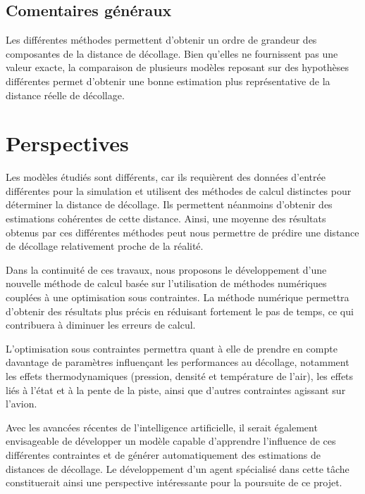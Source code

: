 	\vspace*{1cm}
	
	\subsection{Comentaires généraux  }
	
	Les différentes méthodes permettent d'obtenir un ordre de grandeur des composantes de la distance de décollage.
	Bien qu'elles ne fournissent pas une valeur exacte, la comparaison de plusieurs modèles reposant sur des hypothèses
	différentes permet d'obtenir une bonne estimation plus représentative de la distance réelle de décollage.
	
	
	\vspace*{4cm}
	
	 
	 \section{Perspectives}
	 
	 Les modèles étudiés sont différents, car ils requièrent des données d'entrée différentes pour la simulation et utilisent des méthodes de calcul distinctes pour déterminer la distance de décollage. Ils permettent néanmoins d'obtenir des estimations cohérentes de cette distance. Ainsi, une moyenne des résultats obtenus par ces différentes méthodes peut nous permettre de prédire une distance de décollage relativement proche de la réalité.
	 
	 Dans la continuité de ces travaux, nous proposons le développement d'une nouvelle méthode de calcul basée sur l'utilisation de méthodes numériques couplées à une optimisation sous contraintes. La méthode numérique permettra d'obtenir des résultats plus précis en réduisant fortement le pas de temps, ce qui contribuera à diminuer les erreurs de calcul.
	 
	 L'optimisation sous contraintes permettra quant à elle de prendre en compte davantage de paramètres influençant les performances au décollage, notamment les effets thermodynamiques (pression, densité et température de l'air), les effets liés à l'état et à la pente de la piste, ainsi que d'autres contraintes agissant sur l'avion.
	 
	 Avec les avancées récentes de l'intelligence artificielle, il serait également envisageable de développer un modèle capable d'apprendre l'influence de ces différentes contraintes et de générer automatiquement des estimations de distances de décollage. Le développement d'un agent spécialisé dans cette tâche constituerait ainsi une perspective intéressante pour la poursuite de ce projet.
	 
